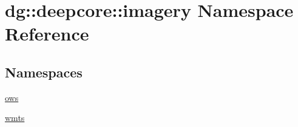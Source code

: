 \hypertarget{namespacedg_1_1deepcore_1_1imagery}{}\section{dg\+:\+:deepcore\+:\+:imagery Namespace Reference}
\label{namespacedg_1_1deepcore_1_1imagery}
\subsection*{Namespaces}
\begin{DoxyCompactItemize}
\item 
 \hyperlink{namespacedg_1_1deepcore_1_1imagery_1_1ows}{ows}
\item 
 \hyperlink{namespacedg_1_1deepcore_1_1imagery_1_1wmts}{wmts}
\end{DoxyCompactItemize}
